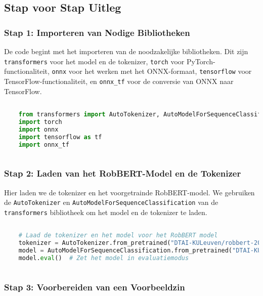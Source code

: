 \subsection{Stap voor Stap Uitleg}

\subsubsection{Stap 1: Importeren van Nodige Bibliotheken}

De code begint met het importeren van de noodzakelijke bibliotheken. Dit zijn \texttt{transformers} voor het model en de tokenizer, \texttt{torch} voor PyTorch-func\-tio\-naliteit, \texttt{onnx} voor het werken met het ONNX-formaat, \texttt{tensorflow} voor TensorFlow-func\-tio\-naliteit, en \texttt{onnx\_tf} voor de conversie van ONNX naar TensorFlow.

\begin{lstlisting}[language=Python, caption={Importeren van benodigde bibliotheken.}]
    
    from transformers import AutoTokenizer, AutoModelForSequenceClassification
    import torch
    import onnx
    import tensorflow as tf
    import onnx_tf
    
\end{lstlisting}

\subsubsection{Stap 2: Laden van het RobBERT-Model en de Tokenizer}

Hier laden we de tokenizer en het voorgetrainde RobBERT-model. We gebruiken de \texttt{AutoTokenizer} en \texttt{AutoModelForSequenceClassification} van de \texttt{transformers} bibliotheek om het model en de tokenizer te laden.

\begin{lstlisting}[language=Python, caption={Laden van de tokenizer en het RobBERT-model.}]
    
    # Laad de tokenizer en het model voor het RobBERT model
    tokenizer = AutoTokenizer.from_pretrained("DTAI-KULeuven/robbert-2023-dutch-large")
    model = AutoModelForSequenceClassification.from_pretrained("DTAI-KULeuven/robbert-2023-dutch-large")
    model.eval()  # Zet het model in evaluatiemodus
    
\end{lstlisting}

\subsubsection{Stap 3: Voorbereiden van een Voorbeeldzin}

